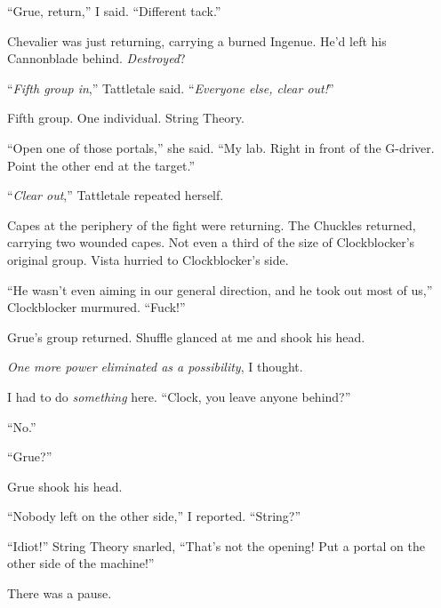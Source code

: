 ``Grue, return,'' I said.  ``Different tack.''



Chevalier was just returning, carrying a burned Ingenue.  He'd left his Cannonblade behind.  \emph{Destroyed}?



``\emph{Fifth group in},'' Tattletale said.  ``\emph{Everyone else, clear out!}''



Fifth group.  One individual.  String Theory.



``Open one of those portals,'' she said.  ``My lab.  Right in front of the G-driver.  Point the other end at the target.''



``\emph{Clear out},'' Tattletale repeated herself.



Capes at the periphery of the fight were returning.  The Chuckles returned, carrying two wounded capes.  Not even a third of the size of Clockblocker's original group.  Vista hurried to Clockblocker's side.



``He wasn't even aiming in our general direction, and he took out most of us,'' Clockblocker murmured.  ``Fuck!''



Grue's group returned.  Shuffle glanced at me and shook his head.



\emph{One more power eliminated as a possibility}, I thought.



I had to do \emph{something} here.  ``Clock, you leave anyone behind?''



``No.''



``Grue?''



Grue shook his head.



``Nobody left on the other side,'' I reported.  ``String?''



``Idiot!''  String Theory snarled, ``That's not the opening!  Put a portal on the other side of the machine!''



There was a pause.



